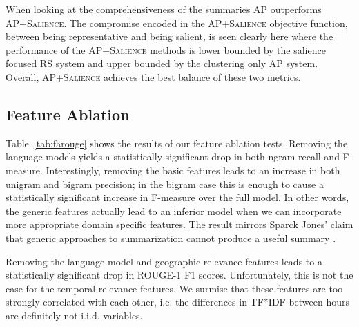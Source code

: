 When looking at the comprehensiveness of the summaries \textsc{AP} outperforms
\textsc{AP+Salience}. The compromise encoded in the \textsc{AP+Salience} 
objective function, between being representative and being salient, is seen 
clearly here where the performance of the \textsc{AP+Salience} methods is 
lower bounded by the salience focused \textsc{RS} system and upper bounded by 
the clustering only \textsc{AP} system. Overall, \textsc{AP+Salience} achieves
the best balance of these two metrics.


\subsection{Feature Ablation}



Table~\ref{tab:farouge} shows the results of our feature ablation tests. 
Removing the language models yields a statistically significant drop in both 
ngram recall and F-measure. Interestingly, removing the basic features leads 
to an increase in both unigram and bigram precision; in the bigram case this 
is enough to cause a statistically significant increase in F-measure over the 
full model. In other words, the generic features actually lead to an inferior 
model when we can incorporate more appropriate domain specific features.
The result mirrors Sparck Jones' claim that generic approaches to 
summarization cannot produce a useful summary \cite{ksj98}.


Removing the language model and geographic relevance features leads to a
statistically significant drop in ROUGE-1 F1 scores. Unfortunately,
this is not the case for the temporal relevance features. We surmise that
these features are too strongly correlated with each other, 
i.e. the differences in TF*IDF between hours are definitely not i.i.d. 
variables. 
